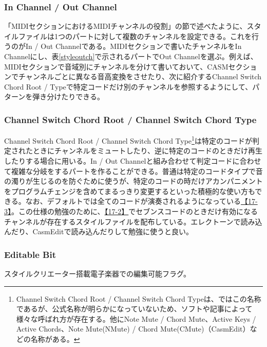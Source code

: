 \documentclass[uplatex, 10pt, dvipdfmx]{jsarticle}
\numberwithin{equation}{section}
\begin{document}
\subsubsection{In Channel / Out Channel}
「MIDIセクションにおけるMIDIチャンネルの役割」の節で述べたように、スタイルファイルは1つのパートに対して複数のチャンネルを設定できる。これを行うのがIn / Out Channelである。MIDIセクションで書いたチャンネルをIn Channelにし、表\ref{styleoutch}で示されるパートでOut Channelを選ぶ。例えば、MIDIセクションで音域別にチャンネルを分けて書いておいて、CASMセクションでチャンネルごとに異なる音高変換をさせたり、次に紹介するChannel Switch Chord Root / Typeで特定コードだけ別のチャンネルを参照するようにして、パターンを弾き分けたりできる。

\subsubsection{Channel Switch Chord Root / Channel Switch Chord Type}
Channel Switch Chord Root / Channel Switch Chord Type\footnote{Channel Switch Chord Root / Channel Switch Chord Typeは、\cite{スタイル}ではこの名称であるが、公式名称が明らかになっていないため、ソフトや記事によって様々な呼ばれ方が存在する。他にNote Mute / Chord Mute\cite{style}、Active Keys / Active Chords\cite{CASMeditor}、Note Mute(NMute) / Chord Mute(CMute)（CasmEdit）などの名称がある。}は特定のコードが判定されたときにチャンネルをミュートしたり、逆に特定のコードのときだけ再生したりする場合に用いる。In / Out Channelと組み合わせて判定コードに合わせて複雑な分岐をするパートを作ることができる。普通は特定のコードタイプで音の濁りが生じるのを防ぐために使うが、特定のコードの時だけアカンパニメントをプログラムチェンジを含めてまるっきり変更するといった積極的な使い方もできる。なお、デフォルトでは全てのコードが演奏されるようになっている\href{http://els01stylefile.music.coocan.jp/Stagea_Style/P1703.htm}{【17-3】}。この仕様の勉強のために、\href{http://els01stylefile.music.coocan.jp/Stagea_Style/P1702.htm}{【17-2】}でセブンスコードのときだけ有効になるチャンネルが存在するスタイルファイルを配布している。エレクトーンで読み込んだり、CasmEditで読み込んだりして勉強に使うと良い。

\subsubsection{Editable Bit}
スタイルクリエーター搭載電子楽器での編集可能フラグ。


\clearpage
\end{document}
